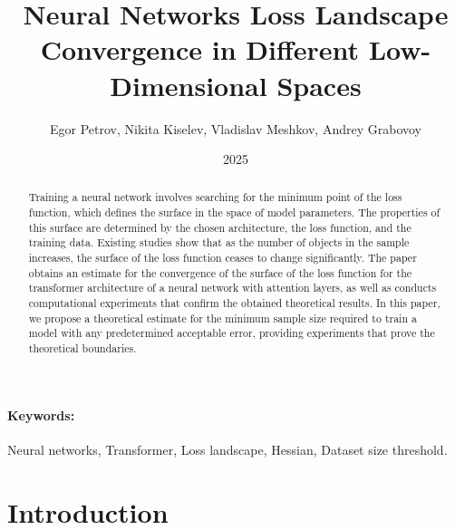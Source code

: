 \documentclass[12pt]{article}
\title{Neural Networks Loss Landscape Convergence in Different Low-Dimensional Spaces}
\author{Egor Petrov, Nikita Kiselev, Vladislav Meshkov, Andrey Grabovoy}
\date{2025}
\begin{document}
\maketitle

\begin{abstract}
    Training a neural network involves searching for the minimum point of the loss function, which defines the surface in the space of model parameters. 
    The properties of this surface are determined by the chosen architecture, the loss function, and the training data. 
    Existing studies show that as the number of objects in the sample increases, the surface of the loss function ceases to change significantly. 
    The paper obtains an estimate for the convergence of the surface of the loss function for the transformer architecture of a neural network with attention layers, as well as conducts computational experiments that confirm the obtained theoretical results. 
    In this paper, we propose a theoretical estimate for the minimum sample size required to train a model with any predetermined acceptable error, providing experiments that prove the theoretical boundaries.

\end{abstract}
\paragraph{Keywords:} 
Neural networks, Transformer, Loss landscape, Hessian, Dataset size threshold.

\section{Introduction}



\end{document}
